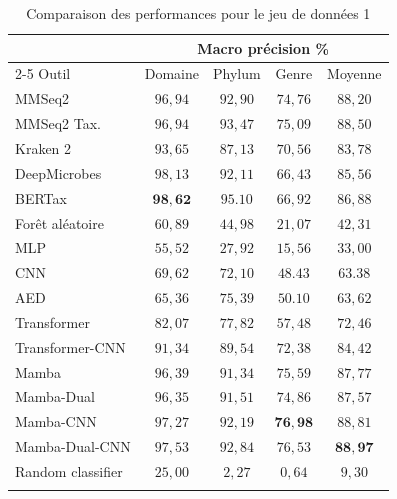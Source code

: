 \begin{table}[hbt!]
\centering
\caption{
    Comparaison des performances pour le jeu de données 1
}
\begin{tabular}{lcccc} \hline
                 & \multicolumn{4}{c}{Macro précision \%}      \\ \cmidrule(lr){2-5}
Outil            & Domaine          & Phylum           & Genre            & Moyenne \\ \hline
MMSeq2           & $96,94$          & $92,90$          & $74,76$          & $88,20$ \\
MMSeq2 Tax.      & $96,94$          & $\mathit{93,47}$ & $75,09$          & $88,50$ \\
Kraken 2         & $93,65$          & $87,13$          & $70,56$          & $83,78$ \\
DeepMicrobes     & $\mathit{98,13}$ & $92,11$          & $66,43$          & $85,56$ \\
BERTax           & $\mathbf{98,62}$ & $\mathbf{95.10}$ & $66,92$          & $86,88$ \\
Forêt aléatoire  & $60,89$          & $44,98$          & $21,07$          & $42,31$ \\
MLP              & $55,52$          & $27,92$          & $15,56$          & $33,00$ \\
CNN              & $69,62$          & $72,10$          & $48.43$          & $63.38$ \\
AED              & $65,36$          & $75,39$          & $50.10$          & $63,62$ \\
Transformer      & $82,07$          & $77,82$          & $57,48$          & $72,46$ \\
Transformer-CNN  & $91,34$          & $89,54$          & $72,38$          & $84,42$ \\
Mamba            & $96,39$          & $91,34$          & $75,59$          & $87,77$ \\
Mamba-Dual       & $96,35$          & $91,51$          & $74,86$          & $87,57$ \\
Mamba-CNN        & $97,27$          & $92,19$          & $\mathbf{76,98}$ & $\mathit{88,81}$ \\
Mamba-Dual-CNN   & $97,53$          & $92,84$          & $\mathit{76,53}$ & $\mathbf{88,97}$ \\
\hline
Random classifier& $25,00$          & $2,27$           & $0,64$           & $9,30$ \\ \hline
\label{table:comparaison_bertax}
\end{tabular}
\end{table}


